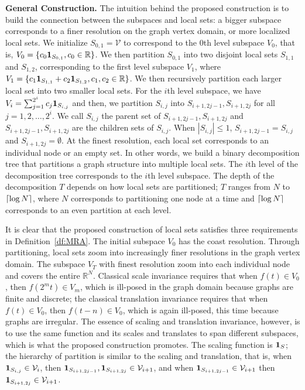 \documentclass[journal,twocolumn,10pt]{IEEEtran}
\theoremstyle{definition}
\newcommand{\mypar}[1]{{\bf #1.}}
\newcommand{\R}{\ensuremath{\mathbb{R}}}
\DeclarePairedDelimiter\ceil{\lceil}{\rceil}
\def\V{\mathcal{V}}
\begin{document}
\mypar{General Construction}
The intuition behind the proposed construction is to build the connection between the subspaces and local sets: a bigger subspace corresponds to a finer resolution on the graph vertex domain, or more localized local sets. We initialize $S_{0,1} = \V$
to correspond to the $0$th level subspace $V_0$, that is, $V_0 = \{
c_0 {\bf 1}_{S_{0,1}}, c_0 \in \R \}$. We then partition $S_{0,1}$
into two disjoint local sets $S_{1,1}$ and $S_{1,2}$, corresponding to the first level subspace $V_1$, where $V_1 = \{ c_1 {\bf 1}_{S_{1,1}}
+ c_2 {\bf 1}_{S_{1,2}}, c_1, c_2 \in \R \}$. We then
recursively partition each larger local set into two smaller local
sets. For the $i$th level subspace, we have $V_i = \sum_{j=1}^{2^i}
c_j {\bf 1}_{S_{i,j}}$ and then, we partition $S_{i,j}$ into
$S_{i+1,2j-1}, S_{i+1,2j}$ for all $j = 1, 2, \ldots, 2^i$.  We call
$S_{i,j}$ the parent set of $S_{i+1,2j-1}, S_{i+1,2j}$ and
$S_{i+1,2j-1}, S_{i+1,2j}$ are the children sets of $S_{i,j}$. When
$|S_{i,j}| \leq 1$, $S_{i+1,2j-1} = S_{i,j}$ and $S_{i+1,2j} =
\emptyset$. At the finest resolution, each local set corresponds to an
individual node or an empty set. In other words, we build a binary
decomposition tree that partitions a graph structure into multiple
local sets. The $i$th level of the decomposition tree corresponds to
the $i$th level subspace. The depth of the decomposition $T$
depends on how local sets are partitioned; $T$ ranges from
$N$ to $\ceil*{\log N}$, where $N$ corresponds to partitioning one
node at a time and $\ceil*{\log N}$ corresponds to an even partition
at each level.




It is clear that the proposed construction of local sets satisfies three requirements in Definition~\ref{df:MRA}. The initial subspace $V_0$ has the coast resolution. Through partitioning, local sets zoom into
increasingly finer resolutions in the graph vertex domain. The subspace $V_T$ with finest resolution zoom into each individual node and covers the entire $\R^N$.  Classical scale invariance requires that when $f(t) \in V_0$, then $f(2^m t) \in V_m$, which is ill-posed
in the graph domain because graphs are finite and discrete;
the classical translation invariance requires that when $f(t) \in
V_0$, then $f(t-n) \in V_0$, which is again ill-posed, this time
because graphs are irregular. The essence of scaling and translation
invariance, however, is to use the same function and its scales and
translates to span different subspaces, which is what the proposed
construction promotes. The scaling function is ${\bf 1}_{S}$; the hierarchy of partition is similar to the scaling and translation, that is, when ${\bf 1}_{S_{i,j}} \in \V_{i}$, then ${\bf 1}_{S_{i+1,2j-1}}, {\bf 1}_{S_{i+1,2j}} \in \V_{i+1}$, and when ${\bf 1}_{S_{i+1,2j-1}} \in \V_{i+1}$ then ${\bf 1}_{S_{i+1,2j}} \in \V_{i+1}$.
\end{document}
